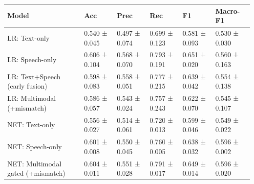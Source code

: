 \begin{tabular}{llllll}
\toprule
Model & Acc & Prec & Rec & F1 & Macro-F1 \\
\midrule
LR: Text-only & 0.540 ± 0.045 & 0.497 ± 0.074 & 0.699 ± 0.123 & 0.581 ± 0.093 & 0.530 ± 0.030 \\
LR: Speech-only & 0.606 ± 0.104 & 0.568 ± 0.070 & 0.793 ± 0.191 & 0.651 ± 0.020 & 0.560 ± 0.163 \\
LR: Text+Speech (early fusion) & 0.598 ± 0.083 & 0.558 ± 0.051 & 0.777 ± 0.215 & 0.639 ± 0.042 & 0.554 ± 0.138 \\
LR: Multimodal (+mismatch) & 0.586 ± 0.057 & 0.543 ± 0.024 & 0.757 ± 0.243 & 0.622 ± 0.070 & 0.545 ± 0.107 \\
NET: Text-only & 0.556 ± 0.027 & 0.514 ± 0.061 & 0.720 ± 0.013 & 0.599 ± 0.046 & 0.549 ± 0.022 \\
NET: Speech-only & 0.601 ± 0.008 & 0.550 ± 0.045 & 0.760 ± 0.005 & 0.638 ± 0.032 & 0.596 ± 0.002 \\
NET: Multimodal gated (+mismatch) & 0.604 ± 0.011 & 0.551 ± 0.028 & 0.791 ± 0.017 & 0.649 ± 0.014 & 0.596 ± 0.020 \\
\bottomrule
\end{tabular}
